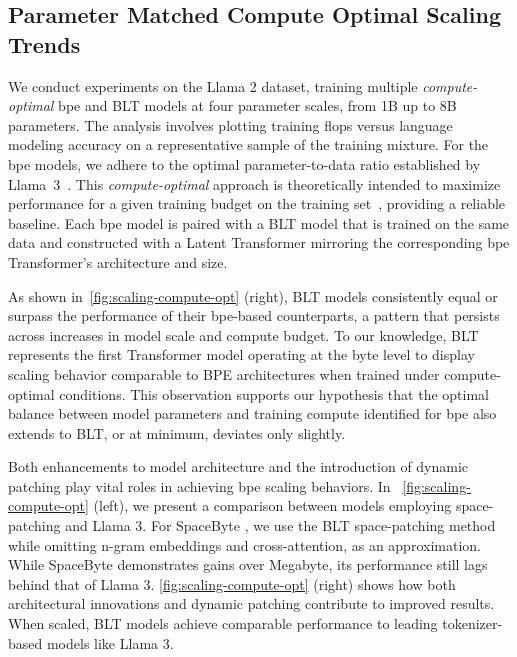 \subsection{Parameter Matched Compute Optimal Scaling Trends}
\label{section:parameter-matched-scaling}
We conduct experiments on the Llama 2 dataset, training multiple \textit{compute-optimal} bpe and {\textsc BLT} models at four parameter scales, from 1B up to 8B parameters. The analysis involves plotting training flops versus language modeling accuracy on a representative sample of the training mixture. For the bpe models, we adhere to the optimal parameter-to-data ratio established by Llama~3~\citep{dubey2024llama}. This \textit{compute-optimal} approach is theoretically intended to maximize performance for a given training budget on the training set~\citep{hoffmann2022training}, providing a reliable baseline. Each bpe model is paired with a {\textsc BLT} model that is trained on the same data and constructed with a Latent Transformer mirroring the corresponding bpe Transformer's architecture and size.

As shown in~\autoref{fig:scaling-compute-opt} (right), {\textsc BLT} models consistently equal or surpass the performance of their bpe-based counterparts, a pattern that persists across increases in model scale and compute budget. To our knowledge, {\textsc BLT} represents the first Transformer model operating at the byte level to display scaling behavior comparable to BPE architectures when trained under compute-optimal conditions. This observation supports our hypothesis that the optimal balance between model parameters and training compute identified for bpe also extends to {\textsc BLT}, or at minimum, deviates only slightly.

Both enhancements to model architecture and the introduction of dynamic patching play vital roles in achieving bpe scaling behaviors. In ~\autoref{fig:scaling-compute-opt} (left), we present a comparison between models employing space-patching and Llama 3. For SpaceByte \citep{slagle2024spacebyte}, we use the {\textsc BLT} space-patching method while omitting n-gram embeddings and cross-attention, as an approximation. While SpaceByte demonstrates gains over Megabyte, its performance still lags behind that of Llama 3. \autoref{fig:scaling-compute-opt} (right) shows how both architectural innovations and dynamic patching contribute to improved results. When scaled, {\textsc BLT} models achieve comparable performance to leading tokenizer-based models like Llama 3.

